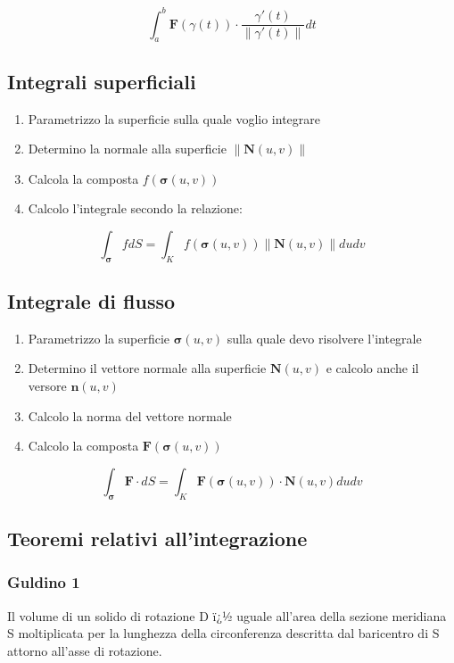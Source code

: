 \documentclass[10pt,a4paper]{report}
\newcommand{\norm}[1]{ \left\lVert {#1} \right\rVert}
\begin{document}
		\[ \int_{a}^{b} \mathbf{F}(\gamma (t)) \cdot \frac{\gamma '(t)}{\norm{\gamma '(t)}} dt \]
		
		\subsection*{Integrali \textbf{superficiali}}
			\begin{enumerate}
				\item Parametrizzo la superficie sulla quale voglio integrare
				\item Determino la normale alla superficie $\norm{\mathbf{N}(u,v)}$
				\item Calcola la composta $f(\mathbf{\sigma} (u,v))$
				\item Calcolo l'integrale secondo la relazione:
			\end{enumerate}
		\[ \int_{\mathbf{\sigma}} fdS = \int_{K} f(\mathbf{\sigma} (u,v)) \norm{\mathbf{N}(u,v)}dudv \]
		
		\subsection*{Integrale di \textbf{flusso}}
		
		\begin{enumerate}
			\item Parametrizzo la superficie $ \mathbf{\sigma}(u,v) $ sulla quale devo risolvere l'integrale 
			\item Determino il vettore normale alla superficie $ \mathbf{N}(u,v) $ e calcolo anche il versore $ \mathbf{n}(u,v) $
			\item Calcolo la norma del vettore normale 
			\item Calcolo la composta $ \mathbf{F}(\mathbf{\sigma}(u,v)) $
		\end{enumerate}
		
		\[  \int_{\mathbf{\sigma}} \mathbf{F} \cdot dS = \int_{K} \mathbf{F}(\mathbf{\sigma}(u,v)) \cdot \mathbf{N}(u,v) dudv\]
		
		\subsection*{Teoremi relativi all'integrazione}
		
			\subsubsection{Guldino 1}
			Il volume di un solido di rotazione D ï¿½ uguale all'area della sezione meridiana S moltiplicata per la lunghezza della circonferenza descritta dal baricentro di S attorno all'asse di rotazione.
			
\end{document}
